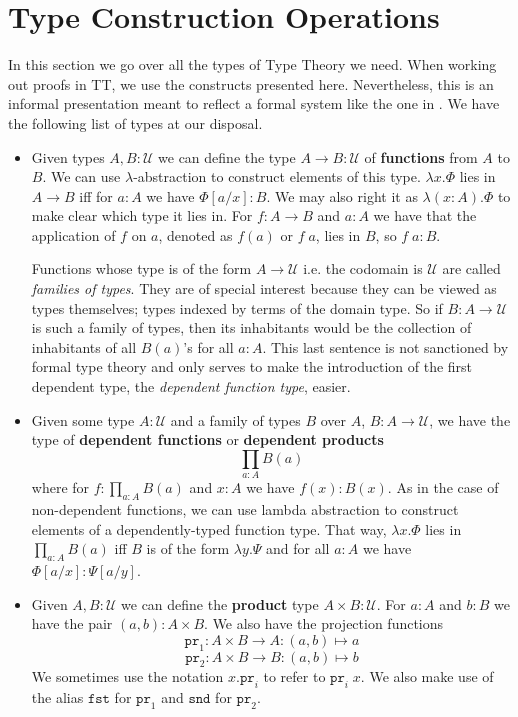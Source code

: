 \documentclass[12pt]{report}
\theoremstyle{definition}
\begin{document}
\section{Type Construction Operations}\label{informalTT}
In this section we go over all the types of Type Theory we need. 
When working out proofs in TT, we use the constructs presented here. 
Nevertheless, this is an informal presentation meant to reflect a formal system like the one in . 
We have the following list of types at our disposal.
\begin{itemize}
	\item Given types $A, B : \mathcal{U}$ we can define the type $A \rightarrow B : \mathcal{U}$ of \textbf{functions} from $A$ to $B$. 
		We can use $\lambda$-abstraction to construct elements of this type. $\lambda x. \Phi$ lies in $A \rightarrow B$ iff for $a : A$ we have $\Phi[a/x] : B$. 
		We may also right it as $\lambda (x : A). \Phi$ to make clear which type it lies in. 
		For $f : A \rightarrow B$ and $a : A$ we have that the application of $f$ on $a$, denoted as $f(a)$ or $f\;a$, lies in $B$, so $f\;a : B$. 

		Functions whose type is of the form $A \rightarrow \mathcal{U}$ i.e. the codomain is $\mathcal{U}$ are called \textit{families of types}. 
		They are of special interest because they can be viewed as types themselves; types indexed by terms of the domain type. 
		So if $B : A \rightarrow \mathcal{U}$ is such a family of types, then its inhabitants would be the collection of inhabitants of all $B(a)$'s for all $a  : A$. 
		This last sentence is not sanctioned by formal type theory and only serves to make the introduction of the first dependent type, the \textit{dependent function type}, easier.
	\item Given some type $A : \mathcal{U}$ and a family of types $B$ over $A$, $B : A \rightarrow \mathcal{U}$, we have the type of \textbf{dependent functions} or \textbf{dependent products} $$\prod_{a : A} B(a)$$
	where for $f : \prod_{a : A} B(a)$ and $x : A$ we have $f(x) : B(x)$. 
	As in the case of non-dependent functions, we can use lambda abstraction to construct elements of a dependently-typed function type. 
	That way, $\lambda x.\Phi$ lies in $\prod_{a:A}B(a)$ iff $B$ is of the form $\lambda y.\Psi$ and for all $a:A$ we have $\Phi[a/x] : \Psi[a/y]$. 
	\item Given $A, B : \mathcal{U}$ we can define the \textbf{product} type $A \times B : \mathcal{U}$. 
	For $a : A$ and $b : B$ we have the pair $(a,b) : A \times B$. 
	We also have the projection functions 
	$$\mathtt{pr}_1 : A \times B \rightarrow A : (a,b) \mapsto a$$
	$$\mathtt{pr}_2 : A \times B \rightarrow B : (a,b) \mapsto b$$
	We sometimes use the notation $x.\mathtt{pr}_i$ to refer to $\mathtt{pr}_i\; x$. 
	We also make use of the alias $\mathtt{fst}$ for $\mathtt{pr}_1$ and $\mathtt{snd}$ for $\mathtt{pr}_2$. 


\end{itemize}
\end{document}
